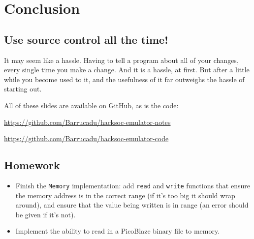 \documentclass[12pt,a4paper]{article}
\begin{document}
\pagebreak
\section{Conclusion}

\subsection{Use source control all the time!}

It may seem like a hassle. Having to tell a program about all of your
changes, every single time you make a change. And it is a hassle, at
first. But after a little while you become used to it, and the
usefulness of it far outweighs the hassle of starting out.

All of these slides are available on GitHub, as is the code:

\url{https://github.com/Barrucadu/hacksoc-emulator-notes}

\url{https://github.com/Barrucadu/hacksoc-emulator-code}

\subsection{Homework}

\begin{itemize}
  \item Finish the \texttt{Memory} implementation: add \texttt{read}
    and \texttt{write} functions that ensure the memory address is in
    the correct range (if it's too big it should wrap around), and
    ensure that the value being written is in range (an error should
    be given if it's not).

  \item Implement the ability to read in a PicoBlaze binary file to
    memory.
\end{itemize}
\end{document}
